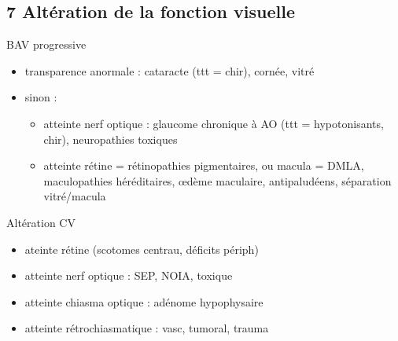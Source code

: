 \documentclass[11pt]{article}
\begin{document}
\begin{table}
\caption{Avec BAV, douloureux: étiologies}
\centering
{}
\label{org3776bac}
\end{table}

\subsection{7 Altération de la fonction visuelle}
\label{sec:org21384b8}
BAV progressive
\begin{itemize}
\item transparence anormale : cataracte (ttt = chir), cornée, vitré
\item sinon : 
\begin{itemize}
\item atteinte nerf optique : glaucome chronique à AO (ttt = hypotonisants,
chir), neuropathies toxiques
\item atteinte rétine = rétinopathies pigmentaires, ou macula = DMLA,
maculopathies héréditaires, \oe{}dème maculaire, antipaludéens, séparation vitré/macula
\end{itemize}
\end{itemize}
Altération CV
\begin{itemize}
\item ateinte rétine (scotomes centrau, déficits périph)
\item atteinte nerf optique : SEP, NOIA, toxique
\item atteinte chiasma optique : adénome hypophysaire
\item atteinte rétrochiasmatique : vasc, tumoral, trauma
\end{itemize}
\end{document}
